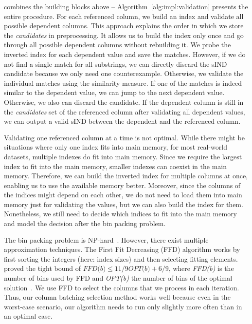 \sawfish combines the building blocks above --
Algorithm~\ref{alg:impl:validation} presents the entire procedure.
For each referenced column, we build an index and validate all possible dependent columns.
This approach explains the order in which we store the \textit{candidates} in preprocessing.
It allows us to build the index only once and go through all possible dependent columns without rebuilding it.
We probe the inverted index for each dependent value and save the matches.
However, if we do not find a single match for all substrings, we can directly discard the sIND candidate because we only need one counterexample. 
Otherwise, we validate the individual matches using the similarity measure.
If one of the matches is indeed similar to the dependent value, we can jump to the next dependent value.
Otherwise, we also can discard the candidate.
If the dependent column is still in the \textit{candidates} set of the referenced column after validating all dependent values, we can output a valid sIND between the dependent and the referenced column.

Validating one referenced column at a time is not optimal.
While there might be situations where only one index fits into main memory, for most real-world datasets, multiple indexes do fit into main memory.
Since we require the largest index to fit into the main memory, smaller indexes can coexist in the main memory.
Therefore, we can build the inverted index for multiple columns at once, enabling us to use the available memory better.
Moreover, since the columns of the indices might depend on each other, we do not need to load them into main memory just for validating the values, but we can also build the index for them.  
Nonetheless, we still need to decide which indices to fit into the main memory and model the decision after the bin packing problem.

The bin packing problem is NP-hard~\cite{MARTELLO199059}.
However, there exist multiple approximation techniques.
The First Fit Decreasing (FFD) algorithm works by first sorting the integers (here: index sizes) and then selecting fitting elements.
\citeauthor{gyorgy2007FFD} proved the tight bound of $\textit{FFD(b)} \leq 11/9\textit{OPT(b)} + 6/9$, where \textit{FFD(b)} is the number of bins used by FFD and \textit{OPT(b)} the number of bins of the optimal solution~\cite{gyorgy2007FFD}.
We use FFD to select the columns that we process in each iteration.
Thus, our column batching selection method works well because even in the worst-case scenario, our algorithm needs to run only slightly more often than in an optimal case.

